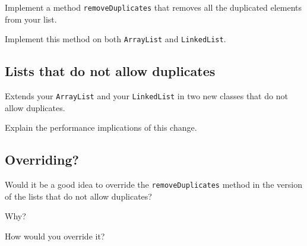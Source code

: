 \documentclass[a4paper, 11pt]{article}
\begin{document}
Implement a method \verb+removeDuplicates+ that removes all the duplicated elements from your list.

Implement this method on both \verb+ArrayList+ and \verb+LinkedList+.


\subsection{Lists that do not allow duplicates}

Extends your \verb+ArrayList+ and your \verb+LinkedList+ in two new classes that do not allow duplicates.

Explain the performance implications of this change.

\subsection{Overriding?}

Would it be a good idea to override the \verb+removeDuplicates+ method in the version of the lists that do not allow duplicates?

Why?

How would you override it?
\end{document}
